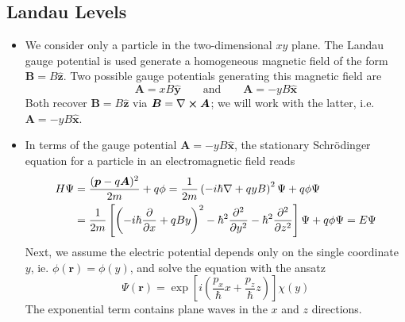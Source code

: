 \documentclass[11pt, a4paper]{article}
\renewcommand{\curl}{\nabla \cross}
\renewcommand{\grad}{\nabla}
\newcommand{\eqtext}[1]{\qquad \text{#1} \qquad}
\newcommand{\Schro}{Schr\"{o}dinger\xspace}
\renewcommand{\vec}[1]{\bm{#1}}  %
\newcommand{\uvec}[1]{\hat{\vec{#1}}}  %
\renewcommand{\r}{\vec{r}}  %
\newcommand{\A}{\vec{A}}  %
\newcommand{\B}{\vec{B}}  %
\renewcommand{\P}{\Psi}  %
\begin{document}
\subsection{Landau Levels}
\begin{itemize}
	\item We consider only a particle in the two-dimensional $ xy $ plane. The Landau gauge potential is used generate a homogeneous magnetic field of the form $ \B = B \uvec{z} $. Two possible gauge potentials generating this magnetic field are
	\begin{equation*}
		\A = x B \uvec{y} \eqtext{and} \A = - y B \uvec{x}
	\end{equation*}
	Both recover $ \B = B \uvec{z} $ via $ \B = \curl \A $; we will work with the latter, i.e. $ \A = - y B \uvec{x} $.
	
	
	\item In terms of the gauge potential $ \A = - y B \uvec{x} $, the stationary \Schro equation for a particle in an electromagnetic field reads
	\begin{align*}
		H\P &= \frac{(\vec{p} - q\A)^{2}}{2m} + q \phi = \frac{1}{2m} \left(-i\hbar \grad + qyB \right)^{2}\P + q \phi \P \\
		&  =\frac{1}{2m}\left[\left(-i\hbar \pdv{x} + qBy\right)^{2} - \hbar^{2}\pdv[2]{}{y} - \hbar^{2}\pdv[2]{}{z}\right]\P + q\phi \P = E \P
	\end{align*}
	Next, we assume the electric potential depends only on the single coordinate $ y $, ie. $ \phi(\r) = \phi(y) $, and solve the equation with the ansatz
	\begin{equation*}
		\P(\r) = \exp\left[i \left(\frac{p_{x}}{\hbar}x + \frac{p_{z}}{\hbar}z \right)\right]\chi(y)
	\end{equation*}
	The exponential term contains plane waves in the $ x $ and $ z $ directions.
	

\end{itemize}
\end{document}
